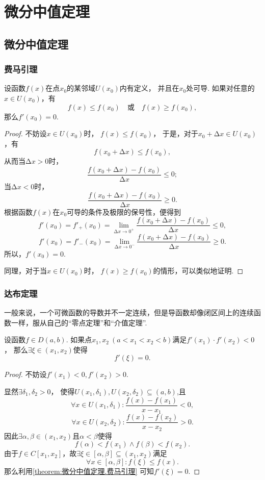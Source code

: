 \chapter{微分中值定理}
\section{微分中值定理}
\subsection{费马引理}
\begin{lemma}[费马引理]\label{theorem:微分中值定理.费马引理}
设函数\(f(x)\)在点\(x_0\)的某邻域\(U(x_0)\)内有定义，
并且在\(x_0\)处可导.
如果对任意的\(x \in U(x_0)\)，有
\[
    f(x) \leq f(x_0)
    \quad\text{或}\quad
    f(x) \geq f(x_0),
\]
那么\(f'(x_0) = 0\).
\begin{proof}
不妨设\(x \in U(x_0)\)时，
\(f(x) \leq f(x_0)\)，
于是，对于\(x_0 + \increment x \in U(x_0)\)，有\[
    f(x_0 + \increment x) \leq f(x_0),
\]
从而当\(\increment x > 0\)时，\[
    \frac{f(x_0 + \increment x) - f(x_0)}{\increment x} \leq 0;
\]
当\(\increment x < 0\)时，\[
    \frac{f(x_0 + \increment x) - f(x_0)}{\increment x} \geq 0.
\]
根据函数\(f(x)\)在\(x_0\)可导的条件及极限的保号性，便得到\[
    f'(x_0) = f'_+(x_0)
    = \lim\limits_{\increment x\to0^+}
    \frac{f(x_0 + \increment x) - f(x_0)}{\increment x} \leq 0,
\]\[
    f'(x_0) = f'_-(x_0)
    = \lim\limits_{\increment x\to0^-}
    \frac{f(x_0 + \increment x) - f(x_0)}{\increment x} \geq 0.
\]
所以，\(f'(x_0) = 0\).

同理，对于当\(x \in U(x_0)\)时，
\(f(x) \geq f(x_0)\)的情形，可以类似地证明.
\end{proof}
\end{lemma}

\subsection{达布定理}
一般来说，一个可微函数的导数并不一定连续，但是导函数却像闭区间上的连续函数一样，服从自己的“零点定理”和“介值定理”.

\begin{theorem}[达布零点定理]\label{theorem:微分中值定理.达布定理1}
设函数\(f \in D(a,b)\).
如果点\(x_1,x_2\ (a<x_1<x_2<b)\)满足\(f'(x_1) \cdot f'(x_2) < 0\)，
那么\(\exists\xi\in(x_1,x_2)\)使得\[
f'(\xi) = 0.
\]
\begin{proof}
不妨设\(f'(x_1)<0,f'(x_2)>0\).

显然\(\exists\delta_1,\delta_2>0\)，
使得\(U(x_1,\delta_1),U(x_2,\delta_2)\subseteq(a,b)\),且\[
\forall x \in U(x_1,\delta_1): \frac{f(x)-f(x_1)}{x-x_1}<0,
\]\[
\forall x \in U(x_2,\delta_2): \frac{f(x)-f(x_2)}{x-x_2}>0.
\]因此\(\exists\alpha,\beta\in(x_1,x_2)\)且\(\alpha<\beta\)使得\[
f(\alpha)<f(x_1) \land f(\beta)<f(x_2).
\]
由于\(f \in C[x_1,x_2]\)，故\(\exists\xi\in[\alpha,\beta]\subseteq(x_1,x_2)\)满足\[
\forall x\in[\alpha,\beta]: f(\xi) \leq f(x).
\]
那么利用\cref{theorem:微分中值定理.费马引理} 可知\(f'(\xi)=0\).
\end{proof}
\end{theorem}

